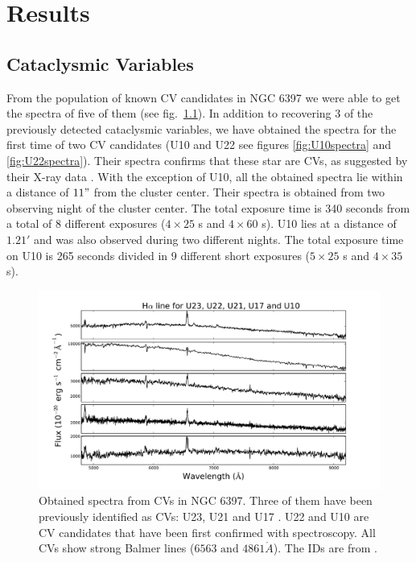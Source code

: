 \chapter{Results}\label{chap:results}
\thispagestyle{fancy}

\section{Cataclysmic Variables }
From the population of known CV candidates in NGC 6397 we were able to get the spectra of five of them (see fig.~\ref{fig:todosspectra}). In addition to recovering 3 of the previously detected cataclysmic variables, we have obtained the spectra for the first time of two CV candidates (U10 and U22 see figures \ref{fig:U10spectra} and \ref{fig:U22spectra}). Their spectra confirms that these star are CVs, as suggested by their X-ray data \citep{grindlay_chandra_2001}. With the exception of U10, all the obtained spectra lie within a distance of $11"$ from the cluster center. Their spectra is obtained from two observing night of the cluster center. The total exposure time is 340 seconds from a total of 8 different exposures ($4 \times 25$ s and $4 \times 60$ s). U10 lies at a distance of $1.21'$ and was also observed during two different nights. The total exposure time on U10 is 265 seconds divided in 9 different short exposures ($5 \times 25$ s and $4 \times 35$ s). 

\begin{figure}[h]
        \centering
        \includegraphics[scale=.6]{assets/images/todostodos.pdf}
\caption{Obtained spectra from CVs in NGC 6397. Three of them have been previously identified as CVs: U23, U21 and U17 \citep{grindlay_spectroscopic_1995,edmonds_cataclysmic_1999}. U22 and  U10 are CV candidates that have been first confirmed with spectroscopy. All CVs show strong Balmer lines ($6563 \text{ and } 4861 \mathring{ A}$). The IDs are from \citep{bogdanov_chandra_2010}.}
\label{fig:todosspectra}
\end{figure}

